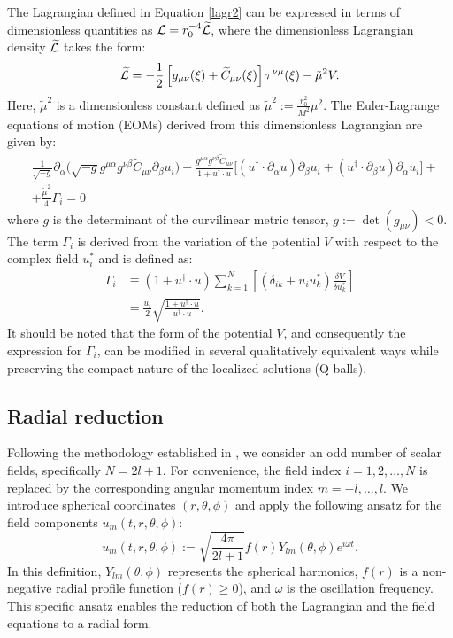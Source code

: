 \documentclass[aps,prd,superscriptaddress,notitlepage,11pt,final,longbibliography,nofootinbib]{revtex4-1}
\newcommand{\be}{\begin{equation}}
\newcommand{\ee}{\end{equation}}
\numberwithin{equation}{section}
\begin{document}
The Lagrangian defined in Equation \eqref{lagr2} can be expressed in terms of dimensionless quantities as ${\cal L}=r_0^{-4}\widetilde{\cal L}$, where the dimensionless Lagrangian density $\widetilde{\cal L}$ takes the form:
\be
\widetilde{\cal L}=-\frac{1}{2}\left[g_{\mu\nu}(\xi)+\widetilde C_{\mu\nu}(\xi)\right]\tau^{\nu\mu}(\xi)-\tilde\mu^2V.
\ee
Here, $\tilde{\mu}^2$ is a dimensionless constant defined as $\tilde{\mu}^2:=\frac{r_0^2}{M^2}\mu^2$. The Euler-Lagrange equations of motion (EOMs) derived from this dimensionless Lagrangian are given by:
\begin{align}
&\frac{1}{\sqrt{-g}}\partial_{\alpha}\Big(\sqrt{-g}g^{\mu\alpha}g^{\nu\beta}\widetilde C_{\mu\nu}\partial_{\beta}u_i\Big)-\frac{g^{\mu\alpha}g^{\nu\beta}\widetilde C_{\mu\nu}}{1+u^{\dagger}\cdot u}\Big[(u^{\dagger}\cdot \partial_{\alpha}u)\partial_{\beta}u_i+(u^{\dagger}\cdot \partial_{\beta}u)\partial_{\alpha}u_i\Big]+\nonumber\\
&+\frac{\tilde\mu^2}{4}\Gamma_i=0\label{eom1}
\end{align}
where $g$ is the determinant of the curvilinear metric tensor, $g:=\det(g_{\mu\nu})<0$. The term $\Gamma_i$ is derived from the variation of the potential $V$ with respect to the complex field $u_i^*$ and is defined as:
\begin{align*}
\Gamma_i&\equiv(1+u^{\dagger}\cdot u)\sum_{k=1}^N\left[(\delta_{ik}+u_iu^*_k)\frac{\delta V}{\delta u_k^*}\right]\\
&=\frac{u_i}{2}\sqrt{\frac{1+u^{\dagger}\cdot u}{u^{\dagger}\cdot u}}.
\end{align*}
It should be noted that the form of the potential $V$, and consequently the expression for $\Gamma_i$, can be modified in several qualitatively equivalent ways while preserving the compact nature of the localized solutions (Q-balls). 

\subsection{Radial reduction}
Following the methodology established in \cite{Klimas:2017eft}, we consider an odd number of scalar fields, specifically $N=2l+1$. For convenience, the field index $i=1, 2, \ldots, N$ is replaced by the corresponding angular momentum index $m=-l, \ldots, l$. We introduce spherical coordinates $(r, \theta, \phi)$ and apply the following ansatz for the field components $u_m(t, r, \theta, \phi)$:
\be
u_m(t,r,\theta,\phi):=\sqrt{\frac{4\pi}{2l+1}}f(r)Y_{lm}(\theta,\phi)e^{i\omega t}.\label{ansatz}
\ee
In this definition, $Y_{lm}(\theta, \phi)$ represents the spherical harmonics, $f(r)$ is a non-negative radial profile function ($f(r) \ge 0$), and $\omega$ is the oscillation frequency. This specific ansatz enables the reduction of both the Lagrangian and the field equations to a radial form.
\end{document}
